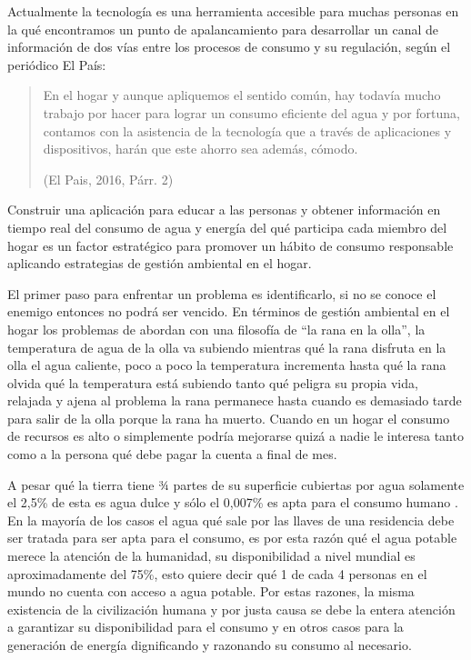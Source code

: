 \documentclass[a4paper,man,natbib]{apa6}
\begin{document}
Actualmente la tecnología es una herramienta accesible para muchas personas en la qué encontramos un punto de apalancamiento para desarrollar un canal de información de dos vías entre los procesos de consumo y su regulación, según el periódico El País:\newline

\begin{quote}
    \vspace{5pt}
    {\small
        En el hogar y aunque apliquemos el sentido común, hay todavía mucho trabajo por hacer para lograr un consumo eficiente del agua y por fortuna, contamos con la asistencia de la tecnología que a través de aplicaciones y dispositivos, harán que este ahorro sea además, cómodo.
    }
    \begin{flushright}
        (El Pais, 2016, Párr. 2)
    \end{flushright}

\end{quote}

Construir una aplicación para educar a las personas y obtener información en tiempo real del consumo de agua y energía del qué participa cada miembro del hogar es un factor estratégico para promover un hábito de consumo responsable aplicando estrategias de gestión ambiental en el hogar.\newline

El primer paso para enfrentar un problema es identificarlo, si no se conoce el enemigo entonces no podrá ser vencido. En términos de gestión ambiental en el hogar los problemas de abordan con una filosofía de “la rana en la olla”,  la temperatura de agua de la olla va subiendo mientras qué la rana disfruta en la olla el agua caliente, poco a poco la temperatura incrementa hasta qué la rana olvida qué la temperatura está subiendo tanto qué peligra su propia vida, relajada y ajena al problema la rana permanece hasta cuando es demasiado tarde para salir de la olla porque la rana ha muerto. Cuando en un hogar el consumo de recursos es alto o simplemente podría mejorarse quizá a nadie le interesa tanto como a la persona qué debe pagar la cuenta a final de mes.\newline

A pesar qué la tierra tiene ¾ partes de su superficie cubiertas por agua solamente el 2,5\% de esta es agua dulce y sólo el 0,007\% es apta para el consumo humano \citep{Aguaenel98:online}. En la mayoría de los casos el agua qué sale por las llaves de una residencia debe ser tratada para ser apta para el consumo, es por esta razón qué el agua potable merece la atención de la humanidad, su disponibilidad a nivel mundial es aproximadamente del 75\%, \citep{Milesdem41:online} esto quiere decir qué 1 de cada 4 personas en el mundo no cuenta con acceso a agua potable. Por estas razones, la misma existencia de la civilización humana y por justa causa se debe la entera atención a garantizar su disponibilidad para el consumo y en otros casos para la generación de energía dignificando y razonando su consumo al necesario.\newline
\end{document}
